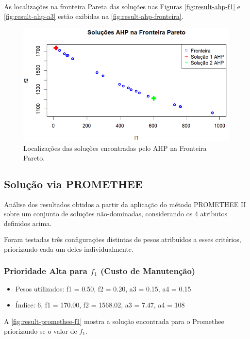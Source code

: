 \documentclass[conference]{IEEEtran}
\begin{document}
As localizações na fronteira Pareta das soluções nas Figuras \ref{fig:result-ahp-f1}
e \ref{fig:result-ahp-a3} estão exibidas na \autoref{fig:result-ahp-fronteira}.

\begin{figure}[htbp]
    \centering
    \includegraphics[width=\columnwidth,trim=1 1 1 1,clip]{../images/result-ahp-fronteira.png}
    \caption{\label{fig:result-ahp-fronteira}
	Localizações das soluções encontradas pelo AHP na Fronteira Pareto.}
\end{figure}


\subsection{Solução via PROMETHEE}

Análise dos resultados obtidos a partir da aplicação do método PROMETHEE II
sobre um conjunto de soluções não-dominadas, considerando os 4 atributos 
definidos acima.

Foram testadas três 
configurações distintas de pesos atribuídos a esses critérios, 
priorizando cada um deles individualmente.

\subsubsection{Prioridade Alta para $f_1$ (Custo de Manutenção)}

\begin{itemize}
	\item Pesos utilizados: f1 = 0.50, f2 = 0.20, a3 = 0.15, a4 = 0.15
	\item Índice: 6, f1 = 170.00, f2 = 1568.02, a3 = 7.47, a4 = 108
\end{itemize}

A \autoref{fig:result-promethee-f1} mostra a solução encontrada para o Promethee 
priorizando-se o valor de $f_1$.
\end{document}
